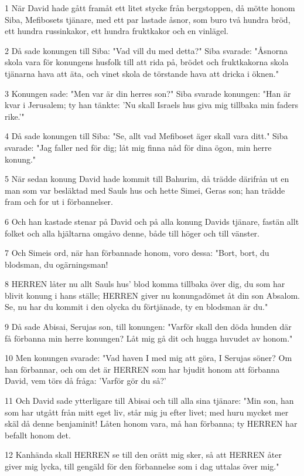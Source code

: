 \par 1 När David hade gått framåt ett litet stycke från bergstoppen, då mötte honom Siba, Mefibosets tjänare, med ett par lastade åsnor, som buro två hundra bröd, ett hundra russinkakor, ett hundra fruktkakor och en vinlägel.
\par 2 Då sade konungen till Siba: "Vad vill du med detta?" Siba svarade: "Åsnorna skola vara för konungens husfolk till att rida på, brödet och fruktkakorna skola tjänarna hava att äta, och vinet skola de törstande hava att dricka i öknen."
\par 3 Konungen sade: "Men var är din herres son?" Siba svarade konungen: "Han är kvar i Jerusalem; ty han tänkte: 'Nu skall Israels hus giva mig tillbaka min faders rike.'"
\par 4 Då sade konungen till Siba: "Se, allt vad Mefiboset äger skall vara ditt." Siba svarade: "Jag faller ned för dig; låt mig finna nåd för dina ögon, min herre konung."
\par 5 När sedan konung David hade kommit till Bahurim, då trädde därifrån ut en man som var besläktad med Sauls hus och hette Simei, Geras son; han trädde fram och for ut i förbannelser.
\par 6 Och han kastade stenar på David och på alla konung Davids tjänare, fastän allt folket och alla hjältarna omgåvo denne, både till höger och till vänster.
\par 7 Och Simeis ord, när han förbannade honom, voro dessa: "Bort, bort, du blodsman, du ogärningsman!
\par 8 HERREN låter nu allt Sauls hus' blod komma tillbaka över dig, du som har blivit konung i hans ställe; HERREN giver nu konungadömet åt din son Absalom. Se, nu har du kommit i den olycka du förtjänade, ty en blodsman är du."
\par 9 Då sade Abisai, Serujas son, till konungen: "Varför skall den döda hunden där få förbanna min herre konungen? Låt mig gå dit och hugga huvudet av honom."
\par 10 Men konungen svarade: "Vad haven I med mig att göra, I Serujas söner? Om han förbannar, och om det är HERREN som har bjudit honom att förbanna David, vem törs då fråga: 'Varför gör du så?'
\par 11 Och David sade ytterligare till Abisai och till alla sina tjänare: "Min son, han som har utgått från mitt eget liv, står mig ju efter livet; med huru mycket mer skäl då denne benjaminit! Låten honom vara, må han förbanna; ty HERREN har befallt honom det.
\par 12 Kanhända skall HERREN se till den orätt mig sker, så att HERREN åter giver mig lycka, till gengäld för den förbannelse som i dag uttalas över mig."
